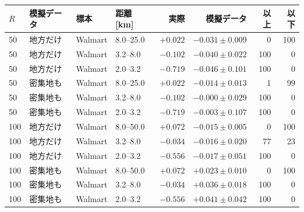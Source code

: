 \begin{tabular}{llllrrrr}
\toprule
$R$ & 模擬データ & 標本 & 距離 [km] & 実際 & 模擬データ & 以上 & 以下 \\
\midrule
50 & 地方だけ & Walmart & 8.0--25.0 & $+0.022$ & $-0.031 \pm 0.009$ & 0 & 100 \\
50 & 地方だけ & Walmart & 3.2--8.0 & $-0.102$ & $-0.040 \pm 0.022$ & 100 & 0 \\
50 & 地方だけ & Walmart & 2.0--3.2 & $-0.719$ & $-0.046 \pm 0.101$ & 100 & 0 \\
50 & 密集地も & Walmart & 8.0--25.0 & $+0.022$ & $-0.014 \pm 0.013$ & 1 & 99 \\
50 & 密集地も & Walmart & 3.2--8.0 & $-0.102$ & $-0.000 \pm 0.029$ & 100 & 0 \\
50 & 密集地も & Walmart & 2.0--3.2 & $-0.719$ & $-0.003 \pm 0.107$ & 100 & 0 \\
\midrule
100 & 地方だけ & Walmart & 8.0--50.0 & $+0.072$ & $-0.015 \pm 0.005$ & 0 & 100 \\
100 & 地方だけ & Walmart & 3.2--8.0 & $-0.034$ & $-0.016 \pm 0.020$ & 77 & 23 \\
100 & 地方だけ & Walmart & 2.0--3.2 & $-0.556$ & $-0.017 \pm 0.051$ & 100 & 0 \\
100 & 密集地も & Walmart & 8.0--50.0 & $+0.072$ & $+0.023 \pm 0.010$ & 0 & 100 \\
100 & 密集地も & Walmart & 3.2--8.0 & $-0.034$ & $+0.036 \pm 0.018$ & 100 & 0 \\
100 & 密集地も & Walmart & 2.0--3.2 & $-0.556$ & $+0.041 \pm 0.042$ & 100 & 0 \\
\bottomrule
\end{tabular}
